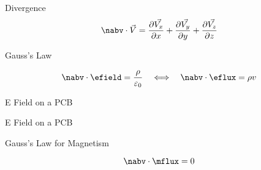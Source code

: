 \begin{frame}{Divergence}
    \begin{equation}
        \nabv \cdot \vec{V} = \frac{\partial \vec{V_x}}{\partial x} + \frac{\partial \vec{V_y}}{\partial y} + \frac{\partial \vec{V_z}}{\partial z}
    \end{equation}
\end{frame}

\begin{frame}{Gauss's Law}
    \begin{twocolumns}[0.5]
    \leftcol
        \vspace{-8pt}
        \begin{equation}
            \nabv \cdot \efield = \frac{\rho}{\varepsilon_0}
            \hspace{1em} \Longleftrightarrow \hspace{1.0em}
            \nabv \cdot \eflux = \rho v
        \end{equation}
    \rightcol
    \end{twocolumns}
\end{frame}
 
\begin{frame}{E Field on a PCB}
    \vspace{-20pt}
\end{frame}

\begin{frame}{E Field on a PCB}
    \vspace{-20pt}
\end{frame}

\begin{frame}{Gauss's Law for Magnetism}
    \begin{twocolumns}[0.35]
        \leftcol
            \vspace{-8pt}
            \begin{equation}
                \nabv \cdot \mflux = 0
            \end{equation}
        \rightcol
    \end{twocolumns}
\end{frame}

